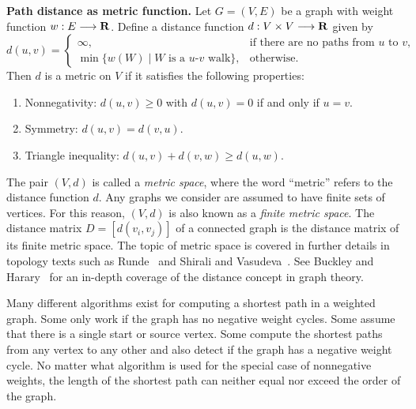 \begin{lemma}
\label{lem:graph_algorithms:path_distance_metric_function}
\textbf{Path distance as metric function.}
Let $G = (V,E)$ be a graph with weight function
$w: E \longrightarrow \mathbf{R}$. Define a distance function
$d: V \times V \longrightarrow \mathbf{R}$ given by
\[
d(u,v)
=
\begin{cases}
\infty, & \text{if there are no paths from $u$ to $v$}, \\
\min\{w(W) \;|\; \text{$W$ is a $u$-$v$ walk}\}, & \text{otherwise}.
\end{cases}
\]
Then $d$ is a metric on $V$ if it satisfies the
following properties:
\begin{enumerate}
\item Nonnegativity: $d(u,v) \geq 0$ with $d(u,v) = 0$ if and only if
  $u = v$.

\item Symmetry: $d(u,v) = d(v,u)$.

\item Triangle inequality:
  $d(u,v) + d(v,w) \geq d(u,w)$.
\end{enumerate}
\end{lemma}

The pair $(V, d)$ is called a \emph{metric space},
where the word ``metric'' refers to the distance
function $d$. Any graphs we consider are
assumed to have finite sets of vertices. For this reason, $(V,d)$ is
also known as a \emph{finite metric space}.
The distance matrix $D = [d(v_i, v_j)]$ of a
connected graph is the distance matrix of its finite metric
space. The topic of metric space is covered
in further details in topology texts such as
Runde~\cite{Runde2005} and
Shirali and
Vasudeva~\cite{ShiraliVasudeva2006}.
See Buckley and Harary~\cite{BuckleyHarary1990} for an in-depth
coverage of the distance concept in graph theory.

Many different algorithms exist for computing a shortest
path in a weighted graph. Some only work if the
graph has no negative weight cycles. Some assume that there is a
single start or source vertex. Some compute the shortest paths from
any vertex to any other and also detect if the graph has a negative
weight cycle. No matter what algorithm is used
for the special case of nonnegative weights,
the length of the shortest path can neither equal
nor exceed the order of the graph.


